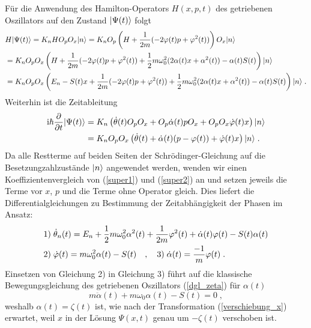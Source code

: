   Für die Anwendung des Hamilton-Operators $H(x,p,t)$ des getriebenen Oszillators auf den Zustand $\lvert\Psi(t)\rangle$ folgt
  \begin{align}
    &H\lvert\Psi(t)\rangle=K_nHO_pO_x\lvert n\rangle
    =K_nO_p\left(H+\frac{1}{2m}(-2\varphi(t)p+\varphi^2(t))\right)O_x\lvert n\rangle \notag\\
    &=K_nO_pO_x\left(H+\frac{1}{2m}(-2\varphi(t)p+\varphi^2(t))+\frac{1}{2}m\omega_0^2(2\alpha(t)x+\alpha^2(t))-\alpha(t)S(t)\right)\lvert n\rangle \notag\\
    &=K_nO_pO_x
    \left(E_n-S(t)x+\frac{1}{2m}(-2\varphi(t)p+\varphi^2(t))+\frac{1}{2}m\omega_0^2(2\alpha(t)x+\alpha^2(t))-\alpha(t)S(t)\right)\lvert n\rangle \;.
    \label{super1}
  \end{align}
  Weiterhin ist die Zeitableitung
  \begin{align}
    \text i\hbar\frac{\partial}{\partial t} \lvert\Psi(t)\rangle
    &=K_n\left(\dot\theta(t)O_pO_x+O_p\dot\alpha(t)pO_x+O_pO_x\dot\varphi(t)x\right)\lvert n\rangle \notag\\
    &=K_nO_pO_x\left(\dot\theta(t)+\dot\alpha(t)(p-\varphi(t))+\dot\varphi(t)x\right)\lvert n\rangle \; .
    \label{super2}
  \end{align}
  Da alle Restterme auf beiden Seiten der Schrödinger-Gleichung auf die Besetzungzahlzustände $\lvert n\rangle$ angewendet werden, wenden wir einen Koeffizientenvergleich von (\ref{super1}) und (\ref{super2}) an und setzen jeweils die Terme vor $x$, $p$ und die Terme ohne Operator gleich.
  Dies liefert die Differentialgleichungen zu Bestimmung der Zeitabhängigkeit der Phasen im Ansatz:
  \begin{align}
    &1)\; \dot\theta_n(t)=E_n+\frac 1 2 m\omega_0^2\alpha^2(t)+\frac{1}{2m}\varphi^2(t)+\dot\alpha(t)\varphi(t)-S(t)\alpha(t) \notag\\
    &2)\; \dot\varphi(t)=m\omega_0^2\alpha(t)-S(t) \quad,\quad 3) \;\dot\alpha(t)=\frac{-1}{m}\varphi(t) \;.
  \end{align}
  Einsetzen von Gleichung 2) in Gleichung 3) führt auf die klassische Bewegungsgleichung des getriebenen Oszillators (\ref{dgl_zeta}) für $\alpha(t)$
  \begin{equation}
    m\ddot\alpha(t)+m\omega_0\alpha(t)-S(t)=0 \;,
  \end{equation}
  weshalb $\alpha(t)=\zeta(t)$ ist, wie nach der Transformation (\ref{verschiebung_x}) erwartet, weil $x$ in der Lösung $\Psi(x,t)$ genau um $-\zeta(t)$ verschoben ist.
